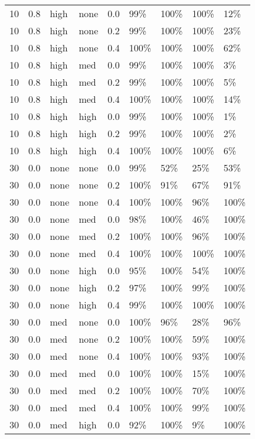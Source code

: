 \begin{longtable}{rrllrllll}
  10 & 0.8 & high & none & 0.0 & 99\% & 100\% & 100\% & 12\% \\ 
  10 & 0.8 & high & none & 0.2 & 99\% & 100\% & 100\% & 23\% \\ 
  10 & 0.8 & high & none & 0.4 & 100\% & 100\% & 100\% & 62\% \\ 
  10 & 0.8 & high & med & 0.0 & 99\% & 100\% & 100\% & 3\% \\ 
  10 & 0.8 & high & med & 0.2 & 99\% & 100\% & 100\% & 5\% \\ 
  10 & 0.8 & high & med & 0.4 & 100\% & 100\% & 100\% & 14\% \\ 
  10 & 0.8 & high & high & 0.0 & 99\% & 100\% & 100\% & 1\% \\ 
  10 & 0.8 & high & high & 0.2 & 99\% & 100\% & 100\% & 2\% \\ 
  10 & 0.8 & high & high & 0.4 & 100\% & 100\% & 100\% & 6\% \\ 
  30 & 0.0 & none & none & 0.0 & 99\% & 52\% & 25\% & 53\% \\ 
  30 & 0.0 & none & none & 0.2 & 100\% & 91\% & 67\% & 91\% \\ 
  30 & 0.0 & none & none & 0.4 & 100\% & 100\% & 96\% & 100\% \\ 
  30 & 0.0 & none & med & 0.0 & 98\% & 100\% & 46\% & 100\% \\ 
  30 & 0.0 & none & med & 0.2 & 100\% & 100\% & 96\% & 100\% \\ 
  30 & 0.0 & none & med & 0.4 & 100\% & 100\% & 100\% & 100\% \\ 
  30 & 0.0 & none & high & 0.0 & 95\% & 100\% & 54\% & 100\% \\ 
  30 & 0.0 & none & high & 0.2 & 97\% & 100\% & 99\% & 100\% \\ 
  30 & 0.0 & none & high & 0.4 & 99\% & 100\% & 100\% & 100\% \\ 
  30 & 0.0 & med & none & 0.0 & 100\% & 96\% & 28\% & 96\% \\ 
  30 & 0.0 & med & none & 0.2 & 100\% & 100\% & 59\% & 100\% \\ 
  30 & 0.0 & med & none & 0.4 & 100\% & 100\% & 93\% & 100\% \\ 
  30 & 0.0 & med & med & 0.0 & 100\% & 100\% & 15\% & 100\% \\ 
  30 & 0.0 & med & med & 0.2 & 100\% & 100\% & 70\% & 100\% \\ 
  30 & 0.0 & med & med & 0.4 & 100\% & 100\% & 99\% & 100\% \\ 
  30 & 0.0 & med & high & 0.0 & 92\% & 100\% & 9\% & 100\% \\ 

\end{longtable}
